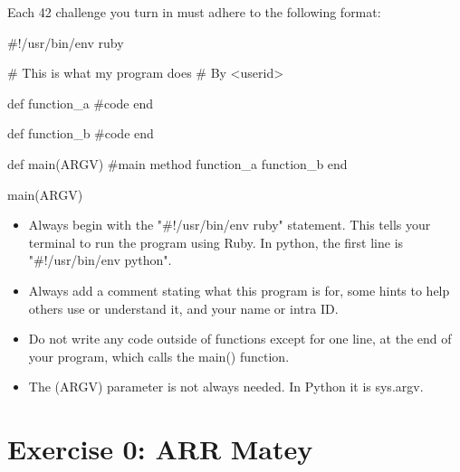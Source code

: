 \documentclass{42-en}
\begin{document}
Each 42 challenge you turn in must adhere to the following format:

\begin{42rbcode}
#!/usr/bin/env ruby

# This is what my program does
# By <userid>

def function_a
 #code
end

def function_b
 #code
end

def main(ARGV)
 #main method
 function_a
 function_b
end

main(ARGV)
\end{42rbcode}

\begin{itemize}
	\item Always begin with the "\#!/usr/bin/env ruby" statement. This tells your terminal to run the program using Ruby. In python, the first line is "\#!/usr/bin/env python".
	\item Always add a comment stating what this program is for, some hints to help others use or understand it, and your name or intra ID.
	\item Do not write any code outside of functions except for one line, at the end of your program, which calls the main() function.
	\item The (ARGV) parameter is not always needed. In Python it is sys.argv.
\end{itemize}


\startexercices



\chapter{Exercise 0: ARR Matey}


\makeheaderfiles
\end{document}
